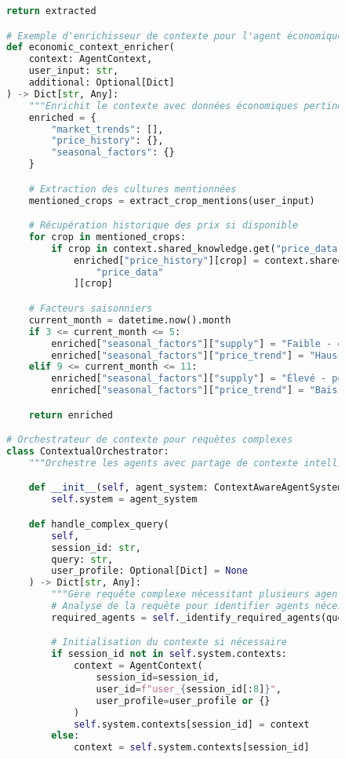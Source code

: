 \begin{figure}[h]
\begin{lstlisting}[language=Python, caption=Système de gestion du contexte inter-agents]
        return extracted

# Exemple d'enrichisseur de contexte pour l'agent économique
def economic_context_enricher(
    context: AgentContext,
    user_input: str,
    additional: Optional[Dict]
) -> Dict[str, Any]:
    """Enrichit le contexte avec données économiques pertinentes."""
    enriched = {
        "market_trends": [],
        "price_history": {},
        "seasonal_factors": {}
    }

    # Extraction des cultures mentionnées
    mentioned_crops = extract_crop_mentions(user_input)

    # Récupération historique des prix si disponible
    for crop in mentioned_crops:
        if crop in context.shared_knowledge.get("price_data", {}):
            enriched["price_history"][crop] = context.shared_knowledge[
                "price_data"
            ][crop]

    # Facteurs saisonniers
    current_month = datetime.now().month
    if 3 <= current_month <= 5:
        enriched["seasonal_factors"]["supply"] = "Faible - début saison"
        enriched["seasonal_factors"]["price_trend"] = "Haussier"
    elif 9 <= current_month <= 11:
        enriched["seasonal_factors"]["supply"] = "Élevé - période récolte"
        enriched["seasonal_factors"]["price_trend"] = "Baissier"

    return enriched

# Orchestrateur de contexte pour requêtes complexes
class ContextualOrchestrator:
    """Orchestre les agents avec partage de contexte intelligent."""

    def __init__(self, agent_system: ContextAwareAgentSystem):
        self.system = agent_system

    def handle_complex_query(
        self,
        session_id: str,
        query: str,
        user_profile: Optional[Dict] = None
    ) -> Dict[str, Any]:
        """Gère requête complexe nécessitant plusieurs agents."""
        # Analyse de la requête pour identifier agents nécessaires
        required_agents = self._identify_required_agents(query)

        # Initialisation du contexte si nécessaire
        if session_id not in self.system.contexts:
            context = AgentContext(
                session_id=session_id,
                user_id=f"user_{session_id[:8]}",
                user_profile=user_profile or {}
            )
            self.system.contexts[session_id] = context
        else:
            context = self.system.contexts[session_id]


\end{lstlisting}
\end{figure}
